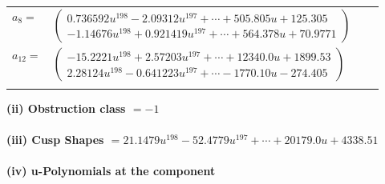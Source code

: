 \documentclass[1p]{elsarticle_modified}
\theoremstyle{definition}
\begin{document}
\begin{tabular}{m{7pt} m{180pt} m{7pt} m{180pt} }
\flushright $a_{8}=$&$\begin{pmatrix}0.736592 u^{198}-2.09312 u^{197}+\cdots+505.805 u+125.305\\-1.14676 u^{198}+0.921419 u^{197}+\cdots+564.378 u+70.9771\end{pmatrix}$ \\
\flushright $a_{12}=$&$\begin{pmatrix}-15.2221 u^{198}+2.57203 u^{197}+\cdots+12340.0 u+1899.53\\2.28124 u^{198}-0.641223 u^{197}+\cdots-1770.10 u-274.405\end{pmatrix}$\\&\end{tabular}
\flushleft \textbf{(ii) Obstruction class $= -1$}\\~\\
\flushleft \textbf{(iii) Cusp Shapes $= 21.1479 u^{198}-52.4779 u^{197}+\cdots+20179.0 u+4338.51$}\\~\\
\newpage\renewcommand{\arraystretch}{1}
\flushleft \textbf{(iv) u-Polynomials at the component}\newline \\
\end{document}
